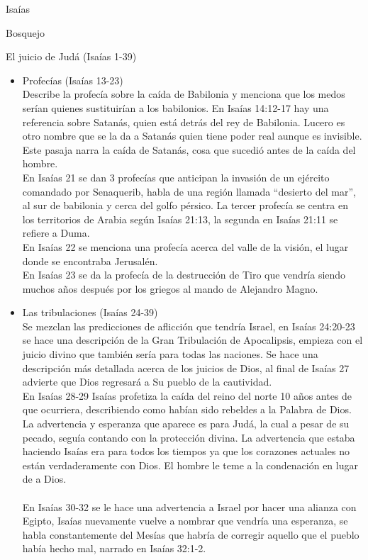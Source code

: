 \begin{section}{Isaías}
\begin{subsection}{Bosquejo}
\begin{subsubsection}{El juicio de Judá (Isaías 1-39)}
\begin{itemize}
En Isaías 10 Isaías habla de Asiria como instrumento de Su ira pues Dios es quien manda a Asiria en contra de Su Pueblo. 
\item Profecías (Isaías 13-23)\\
	Describe la profecía sobre la caída de Babilonia y menciona que los medos serían quienes sustituirían a los babilonios. En Isaías 14:12-17 hay una referencia sobre Satanás, quien está detrás del rey de Babilonia. 
	\newpage
	Lucero es otro nombre que se la da a Satanás quien tiene poder real aunque es invisible. Este pasaja narra la caída de Satanás, cosa que sucedió antes de la caída del hombre.\\
	En Isaías 21 se dan 3 profecías que anticipan la invasión de un ejército comandado por Senaquerib, habla de una región llamada ``desierto del mar'', al sur de babilonia y cerca del golfo pérsico. La tercer profecía se centra en los territorios de Arabia según Isaías 21:13, la segunda en Isaías 21:11 se refiere a Duma.\\
	En Isaías 22 se menciona una profecía acerca del valle de la visión, el lugar donde se encontraba Jerusalén.\\
En Isaías 23 se da la profecía de la destrucción de Tiro que vendría siendo muchos años después por los griegos al mando de Alejandro Magno.
\item Las tribulaciones (Isaías 24-39)\\
	Se mezclan las predicciones de aflicción que tendría Israel, en Isaías 24:20-23 se hace una descripción de la Gran Tribulación de Apocalipsis, empieza con el juicio divino que también sería para todas las naciones. Se hace una descripción más detallada acerca de los juicios de Dios, al final de Isaías 27 advierte que Dios regresará a Su pueblo de la cautividad.\\
	En Isaías 28-29 Isaías profetiza la caída del reino del norte 10 años antes de que ocurriera, describiendo como habían sido rebeldes a la Palabra de Dios. La advertencia y esperanza que aparece es para Judá, la cual a pesar de su pecado, seguía contando con la protección divina. La advertencia que estaba haciendo Isaías era para todos los tiempos ya que los corazones actuales no están verdaderamente con Dios. El hombre le teme a la condenación en lugar de a Dios.\\
	\\
	En Isaías 30-32 se le hace una advertencia a Israel por hacer una alianza con Egipto, Isaías nuevamente vuelve a nombrar que vendría una esperanza, se habla constantemente del Mesías que habría de corregir aquello que el pueblo había hecho mal, narrado en Isaías 32:1-2.\\

\end{itemize}
\end{subsubsection}
\end{subsection}
\end{section}
